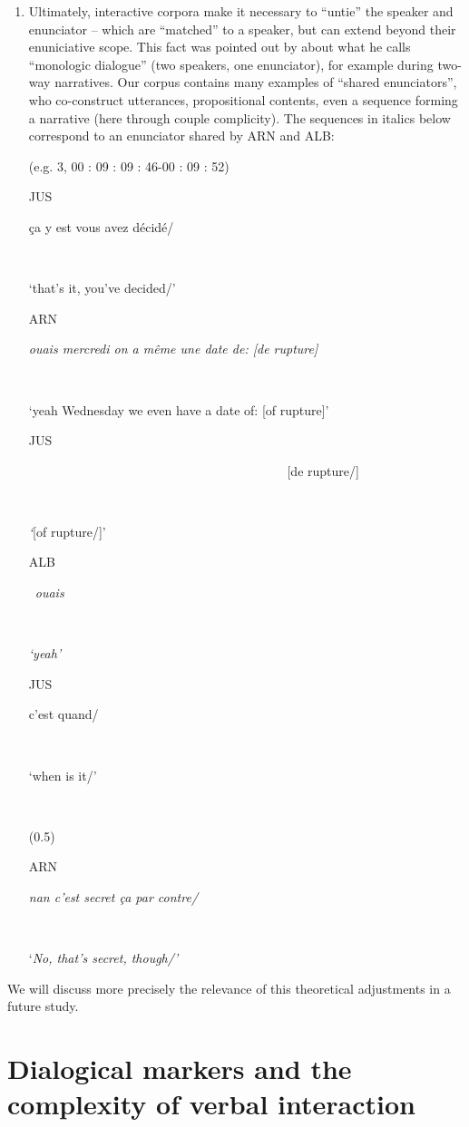 \documentclass[output=paper]{langscibook}
\begin{document}
\begin{enumerate}
\item Ultimately, interactive corpora make it necessary to “untie” \citep{Rabatel2010} the speaker and enunciator -- which are “matched” to a speaker, but can extend beyond their enuniciative scope. This fact was pointed out by \citep{Perrin2021} about what he calls “monologic dialogue” (two speakers, one enunciator), for example during two-way narratives. Our corpus contains many examples of “shared enunciators”, who co-construct utterances, propositional contents, even a sequence forming a narrative (here through couple complicity). The sequences in italics below correspond to an enunciator shared by ARN and ALB:\largerpage[2]

\ea 
\label{ex:8:3}
{(e.g. 3, 00 : 09 : 09 : 46-00 : 09 : 52)}

\upshape\ttfamily
\parbox{8mm}{JUS}{ça y est vous avez décidé/} \\
\parbox{8mm}{~}{‘that's it,   you've decided/’} \medskip

\parbox{8mm}{ARN}{\textsl{ouais mercredi on a même une date de:   [de rupture]}}\\
\parbox{8mm}{~}{{‘yeah Wednesday we even have a date of:   [of rupture]’}}\\
\parbox{8mm}{JUS}{~~ ~~~~~~~~~~~~~~~~~~~~~~~~~~~~~~~~~~~~~~[de rupture/]}\\
\parbox{8mm}{~}{ \textsl{‘}[of rupture/]’}\medskip

\parbox{8mm}{ALB}{~\textsl{ouais}} \\
\parbox{8mm}{~}{\textsl{‘yeah’}}\medskip

\parbox{8mm}{JUS}{c'est quand/}\\ 
\parbox{8mm}{~}{‘when is it/’}\\
\parbox{8mm}{~}{(0.5)} \medskip

\parbox{8mm}{ARN}{\textsl{nan c'est secret ça par contre/}}\\
\parbox{8mm}{~}{    ‘\textsl{No, that's secret, though/’}}\\

\z 
\end{enumerate}

{We will discuss more precisely the relevance of this theoretical adjustments in a future study.}

\section{Dialogical markers and the complexity of verbal interaction}
\end{document}
